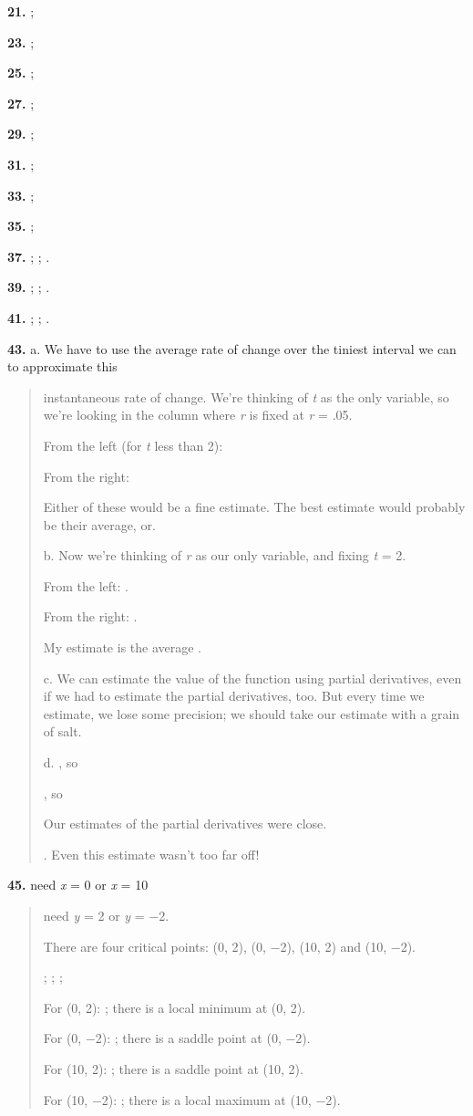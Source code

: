 \textbf{21.} ;

\textbf{23.} ;

\textbf{25.} ;

\textbf{27.} ;

\textbf{29.} ;

\textbf{31.} ;

\textbf{33.} ;

\textbf{35.} ;

\textbf{37.} ; ; .

\textbf{39.} ; ; .

\textbf{41.} ; ; .

\textbf{43.} a. We have to use the average rate of change over the
tiniest interval we can to approximate this

\begin{quote}
instantaneous rate of change. We're thinking of \emph{t} as the only
variable, so we're looking in the column where \emph{r} is fixed at
\emph{r} = .05.

From the left (for \emph{t} less than 2):

From the right:

Either of these would be a fine estimate. The best estimate would
probably be their average, or.

b. Now we're thinking of \emph{r} as our only variable, and fixing
\emph{t} = 2.

From the left: .

From the right: .

My estimate is the average .

c. We can estimate the value of the function using partial derivatives,
even if we had to estimate the partial derivatives, too. But every time
we estimate, we lose some precision; we should take our estimate with a
grain of salt.

d. , so

, so

Our estimates of the partial derivatives were close.

. Even this estimate wasn't too far off!
\end{quote}

\textbf{45.} need \emph{x} = 0 or \emph{x} = 10

\begin{quote}
need \emph{y} = 2 or \emph{y} = −2.

There are four critical points: (0, 2), (0, −2), (10, 2) and (10, −2).

; ; ;

For (0, 2): ; there is a local minimum at (0, 2).

For (0, −2): ; there is a saddle point at (0, −2).

For (10, 2): ; there is a saddle point at (10, 2).

For (10, −2): ; there is a local maximum at (10, −2).
\end{quote}


